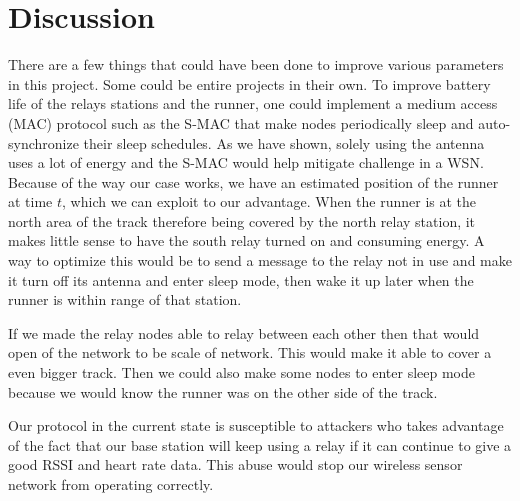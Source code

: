 \section{Discussion}

There are a few things that could have been done to improve various parameters in this project. Some could be entire projects in their own. To improve battery life of the relays stations and the runner, one could implement a medium access (MAC) protocol such as the S-MAC that make nodes periodically sleep and auto-synchronize their sleep schedules. As we have shown, solely using the antenna uses a lot of energy and the S-MAC would help mitigate challenge in a WSN. Because of the way our case works, we have an estimated position of the runner at time $t$, which we can exploit to our advantage. When the runner is at the north area of the track therefore being covered by the north relay station, it makes little sense to have the south relay turned on and consuming energy. A way to optimize this would be to send a message to the relay not in use and make it turn off its antenna and enter sleep mode, then wake it up later when the runner is within range of that station.

\noindent If we made the relay nodes able to relay between each other then that would open of the network to be scale of network. This would make it able to cover a even bigger track. Then we could also make some nodes to enter sleep mode because we would know the runner was on the other side of the track.

\noindent Our protocol in the current state is susceptible to attackers who takes advantage of the fact that our base station will keep using a relay if it can continue to give a good RSSI and heart rate data. This abuse would stop our wireless sensor network from operating correctly.